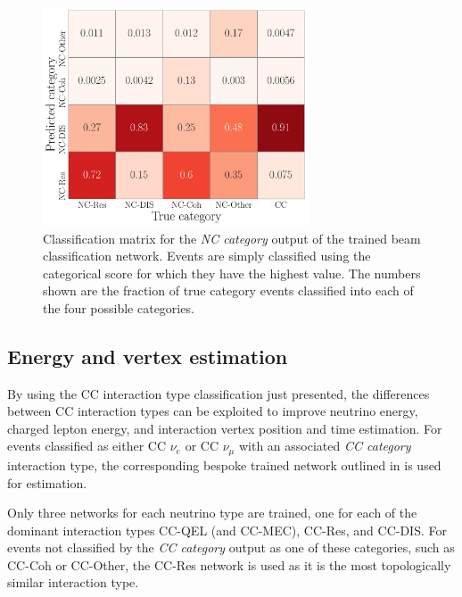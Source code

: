 \begin{figure} %
    \includegraphics[width=0.7\textwidth]{diagrams/7-results/final_nc_cat_confusion.pdf}
    \caption[Classification matrix for the NC category output of the beam classification network]
    {Classification matrix for the \emph{NC category} output of the trained beam classification
        network. Events are simply classified using the categorical score for which they have the
        highest value. The numbers shown are the fraction of true category events classified into
        each of the four possible categories.}
    \label{fig:final_nc_cat_confusion}
\end{figure}

\subsection{Energy and vertex estimation} %
\label{sec:results_eval_energy} %

By using the CC interaction type classification just presented, the differences between CC
interaction types can be exploited to improve neutrino energy, charged lepton energy, and
interaction vertex position and time estimation. For events classified as either CC $\nu_{e}$ or
CC $\nu_{\mu}$ with an associated \emph{CC category} interaction type, the corresponding bespoke
trained network outlined in  is used for estimation.

Only three networks for each neutrino type are trained, one for each of the dominant interaction
types CC-QEL (and CC-MEC), CC-Res, and CC-DIS. For events not classified by the \emph{CC category}
output as one of these categories, such as CC-Coh or CC-Other, the CC-Res network is used as it is
the most topologically similar interaction type.

